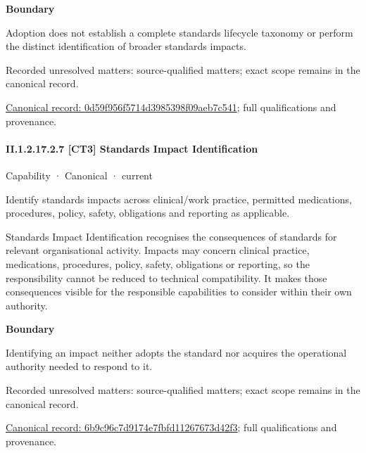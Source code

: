 \textbf{Boundary}



Adoption does not establish a complete standards lifecycle taxonomy or perform the distinct identification of broader standards impacts.


{\small Recorded unresolved matters: source-qualified matters; exact scope remains in the canonical record.}\par
{\footnotesize \href{../../../../../../../continuum/strategy/capability/0d59f956f5714d3985398f09aeb7c541.md}{Canonical record: 0d59f956f5714d3985398f09aeb7c541}; full qualifications and provenance.}\par
\paragraph*{II.1.2.17.2.7 [CT3] Standards Impact Identification}
\label{navigation:II.1.2.17.2.7}

\label{element:6b9c96c7d9174e7fbfd11267673d42f3}
{\small Capability · Canonical · current}\par

Identify standards impacts across clinical/work practice, permitted medications, procedures, policy, safety, obligations and reporting as applicable.



Standards Impact Identification recognises the consequences of standards for relevant organisational activity. Impacts may concern clinical practice, medications, procedures, policy, safety, obligations or reporting, so the responsibility cannot be reduced to technical compatibility. It makes those consequences visible for the responsible capabilities to consider within their own authority.



\textbf{Boundary}



Identifying an impact neither adopts the standard nor acquires the operational authority needed to respond to it.


{\small Recorded unresolved matters: source-qualified matters; exact scope remains in the canonical record.}\par
{\footnotesize \href{../../../../../../../continuum/strategy/capability/6b9c96c7d9174e7fbfd11267673d42f3.md}{Canonical record: 6b9c96c7d9174e7fbfd11267673d42f3}; full qualifications and provenance.}\par
